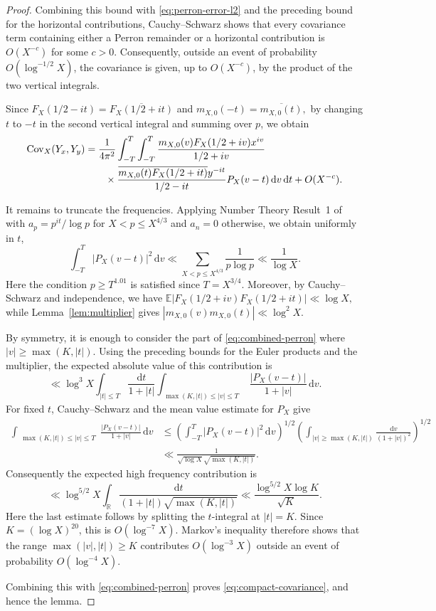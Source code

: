 \documentclass[a4paper,12pt,reqno]{amsart}
\numberwithin{equation}{section}
\theoremstyle{remark}
\newcommand{\E}{\mathbb{E}}
\newcommand{\cov}{\operatorname{Cov}}
\begin{document}
\begin{proof}
Combining this bound with \eqref{eq:perron-error-l2} and the preceding
bound for the horizontal contributions, Cauchy--Schwarz shows that every
covariance term containing either a Perron remainder or a horizontal
contribution is $O(X^{-c})$ for some $c>0$.
Consequently, outside an event of probability $O(\log^{-1/2}X)$, the
covariance is given, up to $O(X^{-c})$, by the product of the two vertical
integrals.

Since
\(
 F_X(1/2-it)=\overline{F_X(1/2+it)}
\)
and
\(
 m_{X,0}(-t)=\overline{m_{X,0}(t)},
\)
by changing $t$ to $-t$ in the second vertical integral and summing over
$p$, we obtain
\begin{align}
 \cov_X(Y_x,Y_y)
 &=\frac1{4\pi^2}
 \int_{-T}^{T}\int_{-T}^{T}
 \frac{m_{X,0}(v)F_X(1/2+iv)x^{iv}}
 {1/2+iv}\notag\\
 &\qquad\times
 \frac{\overline{m_{X,0}(t)F_X(1/2+it)}y^{-it}}
 {1/2-it}
 P_X(v-t)\,\mathrm{d}v\,\mathrm{d}t
 +O(X^{-c}).
 \label{eq:combined-perron}
\end{align}



It remains to truncate the frequencies. Applying Number Theory Result~1 of
\cite[Section~2.2]{Harper2023Large} with
$a_p=p^{it}/\log p$ for $X<p\leq X^{4/3}$ and $a_n=0$
otherwise, we obtain uniformly in $t$,
\[
 \int_{-T}^{T}|P_X(v-t)|^2\,\mathrm{d}v
 \ll
 \sum_{X<p\leq X^{4/3}}\frac1{p\log p}
 \ll\frac1{\log X}.
\]
Here the condition $p\geq T^{1.01}$ is satisfied since
$T=X^{3/4}$. Moreover, by Cauchy--Schwarz and independence, we have \(
 \E|F_X(1/2+iv)F_X(1/2+it)|\ll\log X,
\)
while Lemma~\ref{lem:multiplier} gives
\(
 |m_{X,0}(v)m_{X,0}(t)|\ll\log^2X.
\)

By symmetry, it is enough to consider the part of
\eqref{eq:combined-perron} where \(|v|\geq\max(K,|t|).
\)
Using the preceding bounds for the Euler products and the multiplier, the
expected absolute value of this contribution is
\[
 \ll \log^3X
 \int_{|t|\leq T}\frac{\mathrm{d}t}{1+|t|}
 \int_{\substack{\max(K,|t|)\leq|v|\leq T}}
 \frac{|P_X(v-t)|}{1+|v|}\,\mathrm{d}v.
\]
For fixed $t$, Cauchy--Schwarz and the mean value estimate for $P_X$ give
\[
 \begin{aligned}
 \int_{\substack{\max(K,|t|)\leq|v|\leq T}}
 \frac{|P_X(v-t)|}{1+|v|}\,\mathrm{d}v
 &\leq
 \left(\int_{-T}^{T}|P_X(v-t)|^2\,\mathrm{d}v\right)^{1/2}
 \left(\int_{|v|\geq\max(K,|t|)}
 \frac{\mathrm{d}v}{(1+|v|)^2}\right)^{1/2}\\
 &\ll
 \frac{1}{\sqrt{\log X}\sqrt{\max(K,|t|)}}.
 \end{aligned}
\]
Consequently the expected high frequency contribution is
\[
 \ll
 \log^{5/2}X
 \int_{\mathbb R}
 \frac{\mathrm{d}t}
 {(1+|t|)\sqrt{\max(K,|t|)}}
 \ll
 \frac{\log^{5/2}X\log K}{\sqrt K}.
\]
Here the last estimate follows by splitting the $t$-integral at $|t|=K$.
Since $K=(\log X)^{20}$, this is $O(\log^{-7}X)$. Markov's inequality
therefore shows that the range $\max(|v|,|t|)\geq K$ contributes
$O(\log^{-3}X)$ outside an event of probability $O(\log^{-4}X)$.

Combining this with \eqref{eq:combined-perron} proves
\eqref{eq:compact-covariance}, and hence the lemma.
\end{proof}
\end{document}
